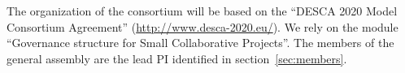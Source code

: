 \label{sect:mgt}

The organization of the consortium will be based on the ``DESCA 2020 Model Consortium
Agreement'' (\url{http://www.desca-2020.eu/}). We rely on the module ``Governance structure
for Small Collaborative Projects''.
%
The members of the general assembly are the lead PI identified in section~\ref{sec:members}.

\milestonetable

